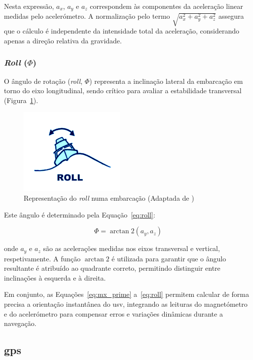 Nesta expressão, \(a_x\), \(a_y\) e \(a_z\) correspondem às componentes da aceleração linear medidas pelo acelerómetro. A normalização pelo termo \(\sqrt{a_x^2 + a_y^2 + a_z^2}\) assegura que o cálculo é independente da intensidade total da aceleração, considerando apenas a direção relativa da gravidade.

\subsubsection{\emph{Roll} (\(\Phi\))}

O ângulo de rotação (\emph{roll}, \(\Phi\)) representa a inclinação lateral da embarcação em torno do eixo longitudinal, sendo crítico para avaliar a estabilidade transversal (Figura~\ref{fig:roll}).

\begin{figure}[H]
    \centering
    \includegraphics[height=0.2\linewidth]{figuras/Roll.png}
    \caption[Representação do \emph{roll} numa embarcação]{Representação do \emph{roll} numa embarcação (Adaptada de \cite{imagem-yaw-pitch-roll})}
    \label{fig:roll}
\end{figure}

Este ângulo é determinado pela Equação~\ref{eq:roll}:

\begin{equation}
    \Phi = \arctan2(a_y, a_z)
    \label{eq:roll}
\end{equation}

onde \(a_y\) e \(a_z\) são as acelerações medidas nos eixos transversal e vertical, respetivamente. A função \(\arctan2\) é utilizada para garantir que o ângulo resultante é atribuído ao quadrante correto, permitindo distinguir entre inclinações à esquerda e à direita.  

Em conjunto, as Equações~\ref{eq:mx_prime} a~\ref{eq:roll} permitem calcular de forma precisa a orientação instantânea do \gls{usv}, integrando as leituras do magnetómetro e do acelerómetro para compensar erros e variações dinâmicas durante a navegação.

\subsection{\acrfull{gps}}
\label{subsec:gps}

